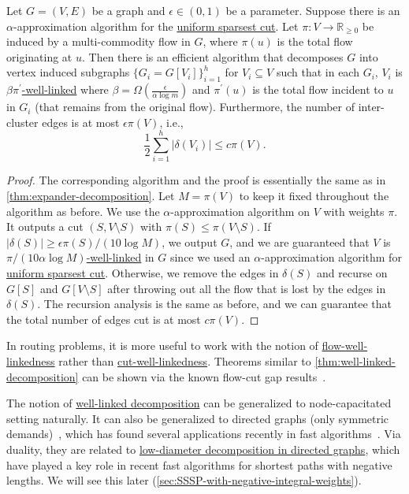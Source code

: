 \begin{theorem}\label{thm:well-linked-decomposition}
	Let \(G = (V, E)\) be a graph and \(\epsilon \in (0, 1)\) be a parameter. Suppose there is an \(\alpha \)-approximation algorithm for the \hyperref[prb:sparsest-cut]{uniform sparsest cut}. Let \(\pi \colon V \to \mathbb{R} _{\geq 0}\) be induced by a multi-commodity flow in \(G\), where \(\pi (u)\) is the total flow originating at \(u\). Then there is an efficient algorithm that decomposes \(G\) into vertex induced subgraphs \(\{ G_i = G[V_i] \} _{i=1}^{h}\) for \(V_i \subseteq V\) such that in each \(G_i\), \(V_i\) is \hyperref[def:weighted-well-linked]{\(\beta \pi ^{\prime} \)-well-linked} where \(\beta = \Omega (\frac{\epsilon }{\alpha \log m})\) and \(\pi ^{\prime} (u)\) is the total flow incident to \(u\) in \(G_i\) (that remains from the original flow). Furthermore, the number of inter-cluster edges is at most \(\epsilon \pi (V)\), i.e.,
	\[
		\frac{1}{2} \sum_{i=1}^{h} \lvert \delta (V_i) \rvert
		\leq c \pi (V).
	\]
\end{theorem}
\begin{proof}
	The corresponding algorithm and the proof is essentially the same as in \autoref{thm:expander-decomposition}. Let \(M = \pi (V)\) to keep it fixed throughout the algorithm as before. We use the \(\alpha \)-approximation algorithm on \(V\) with weights \(\pi \). It outputs a cut \((S, V\setminus S)\) with \(\pi (S) \leq \pi (V\setminus S)\). If \(\lvert \delta (S) \rvert \geq \epsilon \pi (S) / (10 \log M)\), we output \(G\), and we are guaranteed that \(V\) is \hyperref[def:weighted-well-linked]{\(\pi / (10 \alpha \log M)\)-well-linked} in \(G\) since we used an \(\alpha \)-approximation algorithm for \hyperref[prb:sparsest-cut]{uniform sparsest cut}. Otherwise, we remove the edges in \(\delta (S)\) and recurse on \(G[S]\) and \(G[V\setminus S]\) after throwing out all the flow that is lost by the edges in \(\delta (S)\). The recursion analysis is the same as before, and we can guarantee that the total number of edges cut is at most \(c \pi (V)\).
\end{proof}

\begin{remark}
	In routing problems, it is more useful to work with the notion of \hyperref[def:flow-well-linked]{flow-well-linkedness} rather than \hyperref[def:cut-well-linked]{cut-well-linkedness}. Theorems similar to \autoref{thm:well-linked-decomposition} can be shown via the known flow-cut gap results~\cite{chekuri2005multicommodity}.
\end{remark}

The notion of \hyperref[thm:well-linked-decomposition]{well-linked decomposition} can be generalized to node-capacitated setting naturally. It can also be generalized to directed graphs (only symmetric demands)~\cite{chekuri2015all}, which has found several applications recently in fast algorithms~\cite{bernstein2020deterministic}. Via duality, they are related to \hyperref[thm:directed-LDD]{low-diameter decomposition in directed graphs}, which have played a key role in recent fast algorithms for shortest paths with negative lengths. We will see this later (\autoref{sec:SSSP-with-negative-integral-weights}).